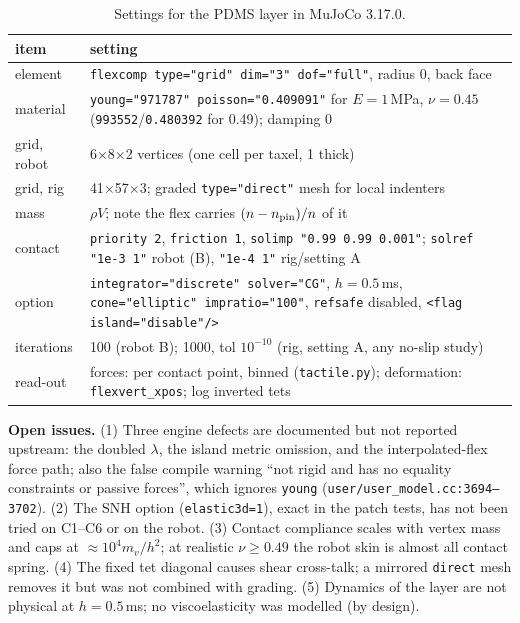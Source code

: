 \documentclass[10pt,twocolumn]{article}
\newcommand{\code}[1]{\texttt{\small #1}}
\newcommand{\src}[1]{\texttt{\footnotesize #1}}
\begin{document}
\begin{table}[t]\centering\footnotesize
\caption{Settings for the PDMS layer in MuJoCo 3.17.0.}
\label{tab:recipe}
\setlength{\tabcolsep}{3pt}
\begin{tabularx}{\columnwidth}{@{}lX@{}}\toprule
item & setting\\\midrule
element & \code{flexcomp type="grid" dim="3" dof="full"}, radius 0, back face \code{<pin gridrange>}\\
material & \code{young="971787" poisson="0.409091"} for $E=1$\,MPa, $\nu=0.45$ (\code{993552}/\code{0.480392} for 0.49); damping 0\\
grid, robot & 6$\times$8$\times$2 vertices (one cell per taxel, 1 thick)\\
grid, rig & 41$\times$57$\times$3; graded \code{type="direct"} mesh for local indenters\\
mass & $\rho V$; note the flex carries $(n-n_{\rm pin})/n$ of it\\
contact & \code{priority 2}, \code{friction 1}, \code{solimp "0.99 0.99 0.001"}; \code{solref "1e-3 1"} robot (B), \code{"1e-4 1"} rig/setting A\\
option & \code{integrator="discrete" solver="CG"}, $h=0.5$\,ms, \code{cone="elliptic" impratio="100"}, \code{refsafe} disabled, \code{<flag island="disable"/>}\\
iterations & 100 (robot B); 1000, tol $10^{-10}$ (rig, setting A, any no-slip study)\\
read-out & forces: per contact point, binned (\code{tactile.py}); deformation: \code{flexvert\_xpos}; log inverted tets\\\bottomrule
\end{tabularx}
\end{table}

\textbf{Open issues.} (1) Three engine defects are documented but not reported upstream: the doubled $\lambda$, the
island metric omission, and the interpolated-flex force path; also the false compile warning ``not rigid and has no
equality constraints or passive forces'', which ignores \code{young} (\src{user/user\_model.cc:3694--3702}). (2) The SNH
option (\code{elastic3d=1}), exact in the patch tests, has not been tried on C1--C6 or on the robot. (3) Contact
compliance scales with vertex mass and caps at $\approx10^4m_v/h^2$; at realistic $\nu\ge0.49$ the robot skin is
almost all contact spring. (4) The fixed tet diagonal causes shear cross-talk; a mirrored \code{direct} mesh removes
it but was not combined with grading. (5) Dynamics of the layer are not physical at $h=0.5$\,ms; no viscoelasticity
was modelled (by design).
\end{document}
